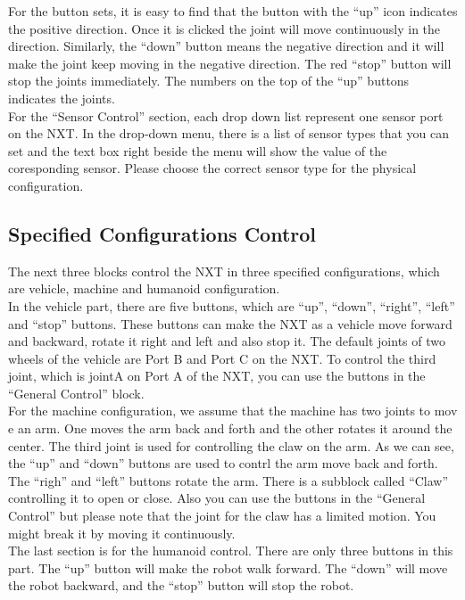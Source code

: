 \documentclass[11pt]{article}
\begin{document}
For the button sets, it is easy to find that the button with the ``up'' icon 
indicates the positive direction. Once it is clicked the joint will move 
continuously in the direction. Similarly, the ``down'' button means the negative 
direction and it will make the joint keep moving in the negative direction. The 
red ``stop'' button will stop the joints immediately. The numbers on the top of 
the ``up'' buttons indicates the joints. \\

For the ``Sensor Control'' section, each drop down list represent one sensor 
port on the NXT. In the drop-down menu, there is a list of sensor types that 
you can set and the text box right beside the menu will show the value of the 
coresponding sensor. Please choose the correct sensor type for the physical 
configuration.

\subsection{Specified Configurations Control\label{sec:gui_specifiedcontrol}}
The next three blocks control the NXT in three specified configurations, which 
are vehicle, machine and humanoid configuration. \\

In the vehicle part, there are five buttons, which are ``up'', ``down'', ``right'', 
``left'' and ``stop'' buttons. These buttons can make the NXT as a vehicle move
forward and backward, rotate it right and left and also stop it. The default
joints of two wheels of the vehicle are Port B and Port C on the NXT. To control 
the third joint, which is jointA on Port A of the NXT, you can use the buttons
in the ``General Control'' block.\\

For the machine configuration, we assume that the machine has two joints to mov
e an arm. One moves the arm back and forth and the other rotates it around the 
center. The third joint is used for controlling the claw on the arm. As we can 
see, the ``up'' and ``down'' buttons are used to contrl the arm move back and 
forth. The ``righ'' and ``left'' buttons rotate the arm. There is a subblock 
called ``Claw'' controlling it to open or close. Also you can use the buttons 
in the ``General Control'' but please note that the joint for the claw has a 
limited motion. You might break it by moving it continuously.\\

The last section is for the humanoid control. There are only three buttons in this
part. The ``up'' button will make the robot walk forward. The ``down'' will move 
the robot backward, and the ``stop'' button will stop the robot.\\
\end{document}
